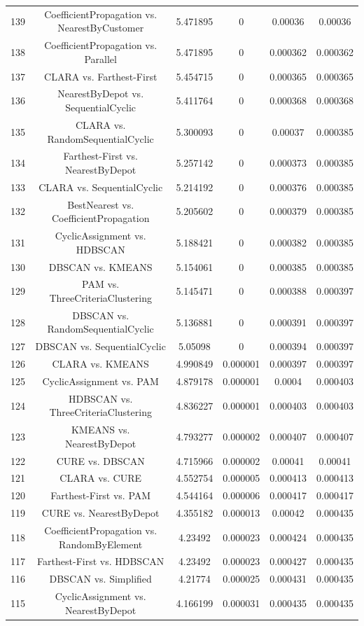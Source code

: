 \documentclass[a4paper,10pt]{article}
\begin{document}
\begin{landscape}
\begin{table}[!htp]
\begin{tabular}{cccccc}
139&CoefficientPropagation vs. NearestByCustomer&5.471895&0&0.00036&0.00036\\
138&CoefficientPropagation vs. Parallel&5.471895&0&0.000362&0.000362\\
137&CLARA vs. Farthest-First&5.454715&0&0.000365&0.000365\\
136&NearestByDepot vs. SequentialCyclic&5.411764&0&0.000368&0.000368\\
135&CLARA vs. RandomSequentialCyclic&5.300093&0&0.00037&0.000385\\
134&Farthest-First vs. NearestByDepot&5.257142&0&0.000373&0.000385\\
133&CLARA vs. SequentialCyclic&5.214192&0&0.000376&0.000385\\
132&BestNearest vs. CoefficientPropagation&5.205602&0&0.000379&0.000385\\
131&CyclicAssignment vs. HDBSCAN&5.188421&0&0.000382&0.000385\\
130&DBSCAN vs. KMEANS&5.154061&0&0.000385&0.000385\\
129&PAM vs. ThreeCriteriaClustering&5.145471&0&0.000388&0.000397\\
128&DBSCAN vs. RandomSequentialCyclic&5.136881&0&0.000391&0.000397\\
127&DBSCAN vs. SequentialCyclic&5.05098&0&0.000394&0.000397\\
126&CLARA vs. KMEANS&4.990849&0.000001&0.000397&0.000397\\
125&CyclicAssignment vs. PAM&4.879178&0.000001&0.0004&0.000403\\
124&HDBSCAN vs. ThreeCriteriaClustering&4.836227&0.000001&0.000403&0.000403\\
123&KMEANS vs. NearestByDepot&4.793277&0.000002&0.000407&0.000407\\
122&CURE vs. DBSCAN&4.715966&0.000002&0.00041&0.00041\\
121&CLARA vs. CURE&4.552754&0.000005&0.000413&0.000413\\
120&Farthest-First vs. PAM&4.544164&0.000006&0.000417&0.000417\\
119&CURE vs. NearestByDepot&4.355182&0.000013&0.00042&0.000435\\
118&CoefficientPropagation vs. RandomByElement&4.23492&0.000023&0.000424&0.000435\\
117&Farthest-First vs. HDBSCAN&4.23492&0.000023&0.000427&0.000435\\
116&DBSCAN vs. Simplified&4.21774&0.000025&0.000431&0.000435\\
115&CyclicAssignment vs. NearestByDepot&4.166199&0.000031&0.000435&0.000435\\

\end{tabular}
\end{table}
\end{landscape}
\end{document}
